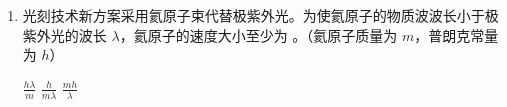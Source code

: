 \documentclass[\gkver]{gaokaozhenti}
\begin{document}
\begin{enumerate}
\begin{enumerate}
	\onepicture[h=4.3cm, align=right]{}

	\begin{enumerate}
		\item
		若电源输出电压为 $U$，电容器两极板间距为 $d$，则极板间电场的电场强度大小为 。

		\item
		设一锡液滴进入电容器时电势能为 $E_{p1}$，其所在位置电势为 $\varphi_{1}$；该液滴即将离开电容器时电势能为 $E_{p2}$，所在位置电势为 $\varphi_{2}$，则 。

		{$E_{p1} > E_{p2}$，$\varphi_{1} > \varphi_{2}$}
		{$E_{p1} < E_{p2}$，$\varphi_{1} < \varphi_{2}$}
		{$E_{p1} > E_{p2}$，$\varphi_{1} < \varphi_{2}$}

		\item
		若锡滴都落在 $b$ 点右侧，在不改变其他条件的情况下，为使锡液滴能落至 $b$ 点，可将 （多选）。

		{电阻 $R$ 的阻值调大}
		{电容器 $C$ 整体上移}
		{电容器 $C$ 整体下移}
		{电容器 $C$ 右极板向左移}
		{电容器 $C$ 右极板向右移}

		\item
		锡离子从高能级态向低能级态跃迁发出波长为 $\lambda$ 的极紫外光，则这两个能级的能量差为 。（普朗克常量为 $h$，真空中的光速为 $c$）
	\end{enumerate}

	\item
	光刻技术新方案采用氦原子束代替极紫外光。为使氦原子的物质波波长小于极紫外光的波长 $\lambda$，氦原子的速度大小至少为 。（氦原子质量为 $m$，普朗克常量为 $h$）

	{$\frac{h\lambda}{m}$}
	{$\frac{h}{m\lambda}$}
	{$\frac{mh}{\lambda}$}
\end{enumerate}
\end{enumerate}
\end{document}
